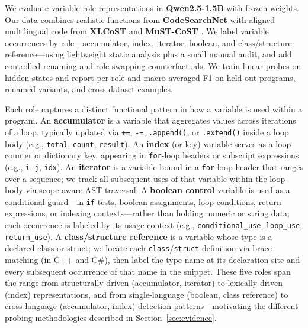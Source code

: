 
We evaluate variable-role representations in \textbf{Qwen2.5-1.5B} with frozen
weights. Our data combines realistic functions from \textbf{CodeSearchNet}
\citep{husain2019codesearchnet} with aligned multilingual code from
\textbf{XLCoST} \citep{zhu2022xlcost} and \textbf{MuST-CoST}
\citep{zhu2022mustcost}. We label variable occurrences by role---accumulator,
index, iterator, boolean, and class/structure reference---using lightweight
static analysis plus a small manual audit, and add controlled renaming and
role-swapping counterfactuals. We train linear probes on hidden states and
report per-role and macro-averaged F1 on held-out programs, renamed variants,
and cross-dataset examples.

Each role captures a distinct functional pattern in how a variable is used
within a program. An \textbf{accumulator} is a variable that aggregates values
across iterations of a loop, typically updated via \texttt{+=}, \texttt{-=},
\texttt{.append()}, or \texttt{.extend()} inside a loop body (e.g.,
\texttt{total}, \texttt{count}, \texttt{result}). An \textbf{index} (or key)
variable serves as a loop counter or dictionary key, appearing in \texttt{for}-loop
headers or subscript expressions (e.g., \texttt{i}, \texttt{j}, \texttt{idx}).
An \textbf{iterator} is a variable bound in a \texttt{for}-loop header that
ranges over a sequence; we track all subsequent uses of that variable within
the loop body via scope-aware AST traversal. A \textbf{boolean control}
variable is used as a conditional guard---in \texttt{if} tests, boolean
assignments, loop conditions, return expressions, or indexing contexts---rather
than holding numeric or string data; each occurrence is labeled by its usage
context (e.g., \texttt{conditional\_use}, \texttt{loop\_use},
\texttt{return\_use}). A \textbf{class/structure reference} is a variable
whose type is a declared class or struct; we locate each \texttt{class}/\texttt{struct}
definition via brace matching (in C++ and C\#), then label the type name at its
declaration site and every subsequent occurrence of that name in the snippet.
These five roles span the range from structurally-driven (accumulator, iterator)
to lexically-driven (index) representations, and from single-language
(boolean, class reference) to cross-language (accumulator, index) detection
patterns---motivating the different probing methodologies described in
Section~\ref{sec:evidence}.

